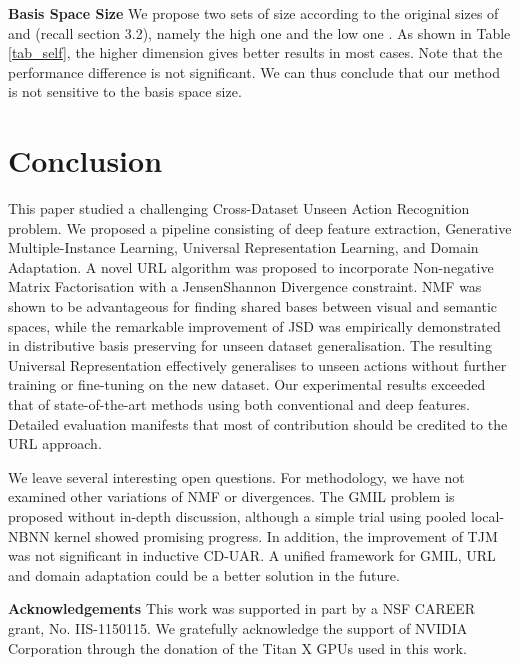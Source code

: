 \documentclass[10pt,twocolumn,letterpaper]{article}
\begin{document}
\noindent\textbf{Basis Space Size} We propose two sets of size according to the original sizes of  and  (recall section 3.2), namely the high one  and the low one . As shown in Table \ref{tab_self}, the higher dimension gives better results in most cases. Note that the performance difference is not significant. We can thus conclude that our method is not sensitive to the basis space size.

\section{Conclusion}
This paper studied a challenging Cross-Dataset Unseen Action Recognition problem. We proposed a pipeline consisting of deep feature extraction, Generative Multiple-Instance Learning, Universal Representation Learning, and Domain Adaptation. A novel URL algorithm was proposed to incorporate Non-negative Matrix Factorisation with a JensenShannon Divergence constraint. NMF was shown to be advantageous for finding shared bases between visual and semantic spaces, while the remarkable improvement of JSD was empirically demonstrated in distributive basis preserving for unseen dataset generalisation. The resulting Universal Representation effectively generalises to unseen actions without further training or fine-tuning on the new dataset. Our experimental results exceeded that of state-of-the-art methods using both conventional and deep features. Detailed evaluation manifests that most of contribution should be credited to the URL approach.

We leave several interesting open questions. For methodology, we have not examined other variations of NMF or divergences. The GMIL problem is proposed without in-depth discussion, although a simple trial using pooled local-NBNN kernel showed promising progress. In addition, the improvement of TJM was not significant in inductive CD-UAR. A unified framework for GMIL, URL and domain adaptation could be a better solution in the future.

\noindent\textbf{Acknowledgements}
This work was supported in part by a NSF CAREER grant, No. IIS-1150115. We gratefully acknowledge the support of NVIDIA Corporation through the donation of the Titan X GPUs used in this work. 


{\small
	
	
}
\end{document}
